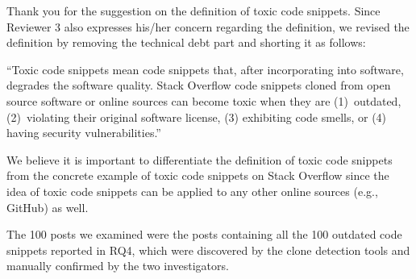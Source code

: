 \documentclass[a4paper,twoside,10pt]{reviewresponse}
\begin{document}

Thank you for the suggestion on the definition of toxic code snippets. Since Reviewer 3 also expresses his/her concern regarding the definition, we revised the definition by removing the technical debt part and shorting it as follows:

``Toxic code snippets mean code snippets that, after incorporating into software, degrades the software quality.
Stack Overflow code snippets
cloned from open source software or online sources can become toxic when they
are (1)~outdated, (2)~violating their original software
license, (3) exhibiting code smells, or (4) having security vulnerabilities.''

We believe it is important to differentiate the definition of toxic code snippets from the concrete example of toxic code snippets on Stack Overflow since the idea of toxic code snippets can be applied to any other online sources (e.g., GitHub) as well.


The 100 posts we examined were the posts containing all the 100 outdated code snippets reported in RQ4, which were discovered by the clone detection tools and manually confirmed by the two investigators.

\end{document}
